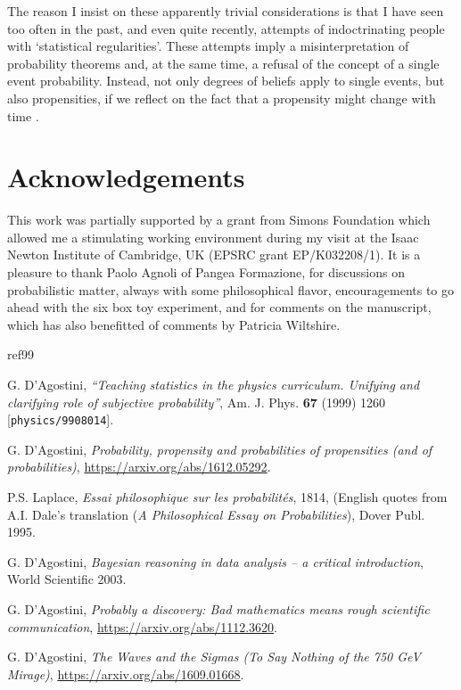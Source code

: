 \documentclass[11pt]{article}
\begin{document}
The reason I insist on these apparently trivial considerations
is that I have seen too often in the past, and even quite recently, 
attempts of indoctrinating people with `statistical regularities'.
These attempts imply a misinterpretation of probability theorems and, 
at the same time, a refusal of the concept 
of a single event probability.
Instead, not only degrees of beliefs apply to single events,
but also propensities, if we reflect on the fact that
a propensity might change with time \cite{ME2016}.

\section*{Acknowledgements}
This work was partially supported by a grant from Simons Foundation
which allowed me a stimulating working environment during
 my visit at the Isaac Newton Institute
of Cambridge, UK (EPSRC grant EP/K032208/1). It is a pleasure
to thank Paolo Agnoli of Pangea Formazione, 
for discussions on probabilistic matter, 
always with some philosophical flavor, encouragements to go 
ahead with the six box toy experiment, 
and for comments  on the manuscript, which 
has also benefitted of comments by Patricia Wiltshire.

\begin{thebibliography} {ref99}

G. D'Agostini, {\it ``Teaching statistics in the physics curriculum. 
Unifying and clarifying role of subjective probability''}, 
{\rm Am. J. Phys}. {\bf 67} (1999) 1260 %
[{\tt physics/9908014}].

G. D'Agostini, {\it Probability, propensity 
and probabilities of propensities 
(and of probabilities)}, \url{https://arxiv.org/abs/1612.05292}.

P.S. Laplace, {\it Essai philosophique sur les probabilités}, 1814,  %
(English quotes  from A.I. Dale's translation
({\em A Philosophical Essay on Probabilities}), 
Dover Publ. 1995.


G. D'Agostini, {\it Bayesian reasoning in data analysis -- 
a critical introduction}, World Scientific 2003.


G. D'Agostini, {\it Probably a discovery: Bad mathematics means rough scientific communication}, 
\url{https://arxiv.org/abs/1112.3620}.

G. D'Agostini, {\it The Waves and the Sigmas (To Say Nothing of the 750 GeV Mirage)}, 
\url{https://arxiv.org/abs/1609.01668}.


\end{thebibliography}
\end{document}
